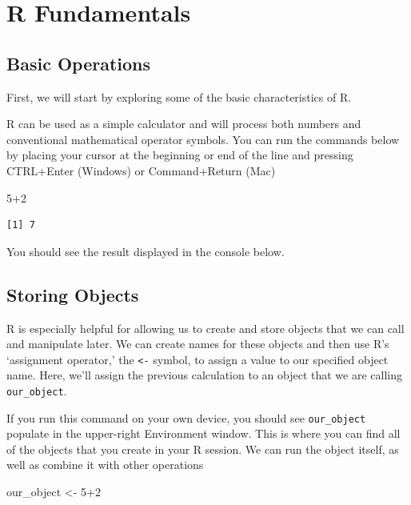 \documentclass[
  letterpaper,
  DIV=11,
  numbers=noendperiod]{scrreprt}
\newenvironment{Shaded}{\begin{snugshade}}{\end{snugshade}}
\newcommand{\DecValTok}[1]{\textcolor[rgb]{0.68,0.00,0.00}{#1}}
\newcommand{\NormalTok}[1]{\textcolor[rgb]{0.00,0.23,0.31}{#1}}
\newcommand{\OtherTok}[1]{\textcolor[rgb]{0.00,0.23,0.31}{#1}}
\newcommand{\SpecialCharTok}[1]{\textcolor[rgb]{0.37,0.37,0.37}{#1}}
\begin{document}
\chapter{R Fundamentals}\label{r-fundamentals}

\section{Basic Operations}\label{basic-operations}

First, we will start by exploring some of the basic characteristics of
R.

R can be used as a simple calculator and will process both numbers and
conventional mathematical operator symbols. You can run the commands
below by placing your cursor at the beginning or end of the line and
pressing CTRL+Enter (Windows) or Command+Return (Mac)

\begin{Shaded}
\begin{Highlighting}[]
\DecValTok{5}\SpecialCharTok{+}\DecValTok{2}
\end{Highlighting}
\end{Shaded}

\begin{verbatim}
[1] 7
\end{verbatim}

You should see the result displayed in the console below.

\section{Storing Objects}\label{storing-objects}

R is especially helpful for allowing us to create and store objects that
we can call and manipulate later. We can create names for these objects
and then use R's `assignment operator,' the \texttt{\textless{}-}
symbol, to assign a value to our specified object name. Here, we'll
assign the previous calculation to an object that we are calling
\texttt{our\_object}.

If you run this command on your own device, you should see
\texttt{our\_object} populate in the upper-right Environment window.
This is where you can find all of the objects that you create in your R
session. We can run the object itself, as well as combine it with other
operations

\begin{Shaded}
\begin{Highlighting}[]
\NormalTok{our\_object }\OtherTok{\textless{}{-}} \DecValTok{5}\SpecialCharTok{+}\DecValTok{2}
\end{Highlighting}
\end{Shaded}
\end{document}
